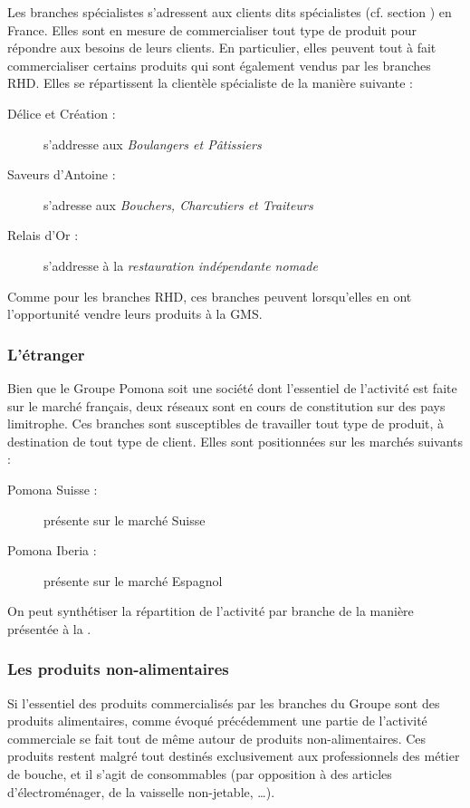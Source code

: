                 Les branches spécialistes s'adressent aux clients dits spécialistes (cf. section ) en France.
                Elles sont en mesure de commercialiser tout type de produit pour répondre aux besoins de leurs clients.
                En particulier, elles peuvent tout à fait commercialiser certains produits qui sont également vendus par les branches RHD.
                Elles se répartissent la clientèle spécialiste de la manière suivante :
                \begin{description}
                    \item[Délice et Création :] s'addresse aux \emph{Boulangers et Pâtissiers}
                    \item[Saveurs d'Antoine :] s'adresse aux \emph{Bouchers, Charcutiers et Traiteurs}
                    \item[Relais d'Or :] s'addresse à la \emph{restauration indépendante nomade}
                \end{description}
                Comme pour les branches RHD, ces branches peuvent lorsqu'elles en ont l'opportunité vendre leurs produits à la GMS.

                \subsubsection{L'étranger}

                Bien que le Groupe Pomona soit une société dont l'essentiel de l'activité est faite sur le marché français, deux réseaux sont en cours de constitution sur des pays limitrophe.
                Ces branches sont susceptibles de travailler tout type de produit, à destination de tout type de client.
                Elles sont positionnées sur les marchés suivants : 
                \begin{description}
                    \item[Pomona Suisse :] présente sur le marché Suisse
                    \item[Pomona Iberia :] présente sur le marché Espagnol 
                \end{description}

                On peut synthétiser la répartition de l'activité par branche de la manière présentée à la .

                \subsubsection{Les produits non-alimentaires}
                \label{produits_nonal}
                Si l'essentiel des produits commercialisés par les branches du Groupe sont des produits alimentaires, comme évoqué précédemment une partie de l'activité commerciale se fait tout de même autour de produits non-alimentaires.
                Ces produits restent malgré tout destinés exclusivement aux professionnels des métier de bouche, et il s'agit de consommables (par opposition à des articles d'électroménager, de la vaisselle non-jetable, \dots).

